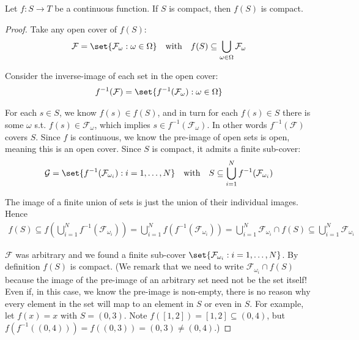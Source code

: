 \documentclass{article}
\begin{document}
\begin{theorem}
  Let $f: S \to T$ be a continuous function. If $S$ is compact, then $f(S)$ is compact.
\end{theorem}

\begin{proof}
  Take any open cover of $f(S)$:
  \begin{align*}
    \mathcal{F}
    =
    \set{\mathcal{F}_\omega: \omega \in \Omega}
    \quad
    \text{with}
    \quad
    f(S)
    \subseteq
    \bigcup_{\omega \in \Omega}
    \mathcal{F}_\omega
  \end{align*}

  Consider the inverse-image of each set in the open cover:
  \begin{align*}
    f^{-1}(\mathcal{F})
    =
    \set{f^{-1}(\mathcal{F}_\omega): \omega \in \Omega}
  \end{align*}

  For each $s \in S$, we know $f(s) \in f(S)$, and in turn for each $f(s) \in S$ there is some $\omega$ s.t. $f(s) \in \mathcal{F}_\omega$, which implies $s \in f^{-1}(\mathcal{F}_\omega)$. In other words $f^{-1}(\mathcal{F})$ covers $S$. Since $f$ is continuous, we know the pre-image of open sets is open, meaning this is an open cover. Since $S$ is compact, it admits a finite sub-cover:
  \begin{align*}
    \mathcal{G}
    =
    \set{f^{-1}(\mathcal{F}_{\omega_i}): i = 1, \ldots, N}
    \quad
    \text{with}
    \quad
    S
    \subseteq
    \bigcup_{i = 1}^N
    f^{-1}(\mathcal{F}_{\omega_i})
  \end{align*}

  The image of a finite union of sets is just the union of their individual images. Hence
  \begin{align*}
    f(S)
    \subseteq
    f\left(
      \bigcup_{i = 1}^N
      f^{-1}(\mathcal{F}_{\omega_i})
    \right)
    =
    \bigcup_{i = 1}^N
    f\left(
      f^{-1}(\mathcal{F}_{\omega_i})
    \right)
    =
    \bigcup_{i = 1}^N
    \mathcal{F}_{\omega_i} \cap f(S)
    \subseteq
    \bigcup_{i = 1}^N
    \mathcal{F}_{\omega_i}
  \end{align*}

  $\mathcal{F}$ was arbitrary and we found a finite sub-cover $\set{\mathcal{F}_{\omega_i}: i = 1, \ldots, N}$. By definition $f(S)$ is compact. (We remark that we need to write $\mathcal{F}_{\omega_i} \cap f(S)$ because the image of the pre-image of an arbitrary set need not be the set itself! Even if, in this case, we know the pre-image is non-empty, there is no reason why every element in the set will map to an element in $S$ or even in $S$. For example, let $f(x) = x$ with $S = (0, 3)$. Note $f([1, 2]) = [1, 2] \subseteq (0, 4)$, but $f(f^{-1}((0, 4))) = f((0, 3)) = (0, 3) \ne (0, 4)$.)
\end{proof}
\end{document}
